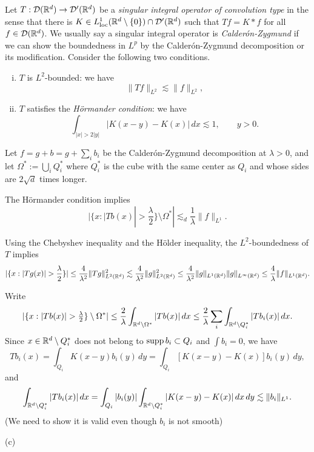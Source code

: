 \documentclass{../../large}
\begin{document}
\begin{prb}
Let $T:\mathcal{D}(\mathbb{R}^d)\to\mathcal{D}'(\mathbb{R}^d)$ be a \emph{singular integral operator of convolution type} in the sense that there is $K\in L_{\mathrm{loc}}^1(\mathbb{R}^d\setminus\{0\})\cap\mathcal{D}'(\mathbb{R}^d)$ such that $Tf=K*f$ for all $f\in\mathcal{D}(\mathbb{R}^d)$.
We usually say a singular integral operator is \emph{Calder\'on-Zygmund} if we can show the boundedness in $L^p$ by the Calder\'on-Zygmund decomposition or its modification.
Consider the following two conditions.
\begin{enumerate}[(i)]
\item $T$ is $L^2$-bounded: we have
\[\|Tf\|_{L^2}\lesssim\|f\|_{L^2},\]
\item $T$ satisfies the \emph{H\"ormander condition}: we have
\[\int_{|x|>2|y|}|K(x-y)-K(x)|\,dx\lesssim1,\qquad y>0.\]
\end{enumerate}

Let $f=g+b=g+\sum_ib_i$ be the Calder\'on-Zygmund decomposition at $\lambda>0$, and let $\Omega^*:=\bigcup_iQ_i^*$ where $Q_i^*$ is the cube with the same center as $Q_i$ and whose sides are $2\sqrt d$ times longer. 
\begin{parts}
\item
The H\"ormander condition implies
\[|\{x:|Tb(x)|>\frac\lambda2\}\setminus\Omega^*|\lesssim_d\frac1\lambda\|f\|_{L^1}.\]
\item
\end{parts}
\end{prb}
\begin{pf}
Using the Chebyshev inequality and the H\"older inequality, the $L^2$-boundedness of $T$ implies
\[|\{x:|Tg(x)|>\frac\lambda2\}|
\le\frac4{\lambda^2}\|Tg\|_{L^2(\R^d)}^2
\lesssim\frac4{\lambda^2}\|g\|_{L^2(\R^d)}^2
\le\frac4{\lambda^2}\|g\|_{L^1(\R^d)}\|g\|_{L^\infty(\R^d)}
\le\frac4\lambda\|f\|_{L^1(\R^d)}.
\]

Write
\[|\{x:|Tb(x)|>\tfrac\lambda2\}\setminus\Omega^*|
\le\frac2\lambda\int_{\R^d\setminus\Omega^*}|Tb(x)|\,dx
\le\frac2\lambda\sum_i\int_{\R^d\setminus Q_i^*}|Tb_i(x)|\,dx.\]
Since $x\in\mathbb{R}^d\setminus Q_i^*$ does not belong to $\operatorname{supp} b_i\subset Q_i$ and $\int b_i=0$, we have
\[Tb_i(x)=\int_{Q_i}K(x-y)b_i(y)\,dy=\int_{Q_i}[K(x-y)-K(x)]b_i(y)\,dy,\]
and
\[\int_{\mathbb{R}^d\setminus Q_i^*}|Tb_i(x)|\,dx
=\int_{Q_i}|b_i(y)|\int_{\mathbb{R}^d\setminus Q_i^*}|K(x-y)-K(x)|\,dx\,dy
\lesssim\|b_i\|_{L^1}.\]
(We need to show it is valid even though $b_i$ is not smooth)

(c)

\end{pf}
\end{document}
